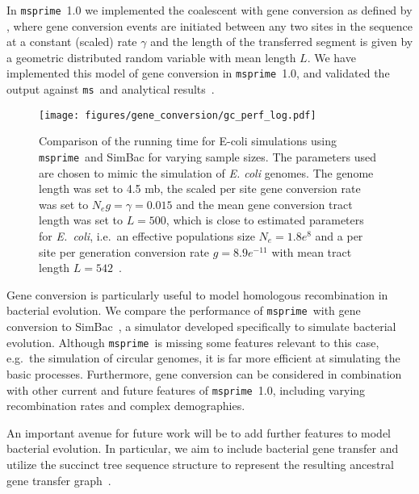 \documentclass{article}
\newcommand{\msprime}[0]{\texttt{msprime}}
\newcommand{\ms}[0]{\texttt{ms}}
\begin{document}
In \msprime\ 1.0 we implemented the coalescent with gene conversion as defined by
\cite{wiuf2000coalescent}, where gene conversion events are initiated between any
two sites in the sequence at a constant (scaled) rate $\gamma$ and
the length of the transferred segment is given by a geometric distributed
random variable with mean length $L$.
We have implemented this model of gene
conversion in \msprime\ 1.0, and validated the output against
\ms\ and analytical results~\citep{wiuf2000coalescent}.

\begin{figure}
\texttt{[image: figures/gene\_conversion/gc\_perf\_log.pdf]}
\caption{\label{fig-gc-perf}Comparison of the running time
for E-coli simulations using \msprime\ and SimBac for varying
sample sizes. The parameters used are chosen to mimic the simulation
of \textit{E. coli} genomes. The genome length was set to 4.5 mb, the scaled per site
gene conversion rate was set to $N_e g = \gamma = 0.015$ and
the mean gene conversion tract length was set to $L = 500$, which is close to
estimated parameters for \textit{E.\ coli}, i.e.\ an effective populations size
$N_e = 1.8e^8$ and a per site per generation conversion rate $g = 8.9e^{-11}$
with mean tract length $L = 542$~\citep{Lapierre2016}.}
\end{figure}

Gene conversion is particularly useful to model homologous recombination in
bacterial evolution.
We compare the performance of \msprime\ with gene conversion to
SimBac~\citep{brown2016simbac}, a simulator developed specifically to
simulate bacterial evolution. Although \msprime\ is missing some features
relevant to this case, e.g.\ the simulation of circular genomes, it is far
more efficient at simulating the basic processes.
Furthermore, gene conversion can be considered in combination
with other current and future features of \msprime\ 1.0,
including varying recombination rates and complex demographies.

An important avenue for future work
will be to add further features to model bacterial
evolution. In particular, we aim to include bacterial gene transfer and utilize
the succinct tree sequence structure to represent the resulting ancestral gene
transfer graph~\citep{baumdicker2014AGTG}.
\end{document}
